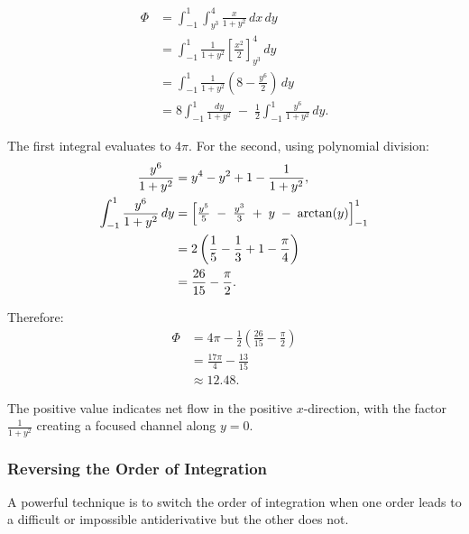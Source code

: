 \begin{example}
\begin{solution}
\begin{align*}
\Phi &= \int_{-1}^{1} \int_{y^3}^{4} \frac{x}{1+y^2}\,dx\,dy \\
&= \int_{-1}^{1} \frac{1}{1+y^2} \left[\frac{x^2}{2}\right]_{y^3}^{4}\,dy \\
&= \int_{-1}^{1} \frac{1}{1+y^2}\!\left(8 - \frac{y^6}{2}\right)\,dy \\
&= 8\int_{-1}^{1} \!\!\frac{dy}{1+y^2}
\;-\;\frac{1}{2}\int_{-1}^{1} \frac{y^6}{1+y^2}\,dy.
\end{align*}

The first integral evaluates to $4\pi$. For the second, using polynomial division:
\begin{align*}
\frac{y^6}{1+y^2} &= y^4 - y^2 + 1 - \frac{1}{1+y^2}, \\
\int_{-1}^{1} \frac{y^6}{1+y^2}\,dy &= \Bigl[\tfrac{y^5}{5} \;-\;\tfrac{y^3}{3} \;+\;y \;-\;\arctan(y)\Bigr]_{-1}^{1} \\
&= 2\left(\frac{1}{5} - \frac{1}{3} + 1 - \frac{\pi}{4}\right) \\
&= \frac{26}{15} - \frac{\pi}{2}.
\end{align*}

Therefore:
\begin{align*}
\Phi &= 4\pi - \frac{1}{2}\left(\frac{26}{15} - \frac{\pi}{2}\right) \\
&= \frac{17\pi}{4} - \frac{13}{15} \\
&\approx 12.48.
\end{align*}

\noindent The positive value indicates net flow in the positive $x$-direction, with the factor $\frac{1}{1+y^2}$ creating a focused channel along $y=0$.
\end{solution}
\end{example}


\subsubsection*{Reversing the Order of Integration}

\noindent A powerful technique is to switch the order of integration when one order leads to a difficult or impossible antiderivative but the other does not.

